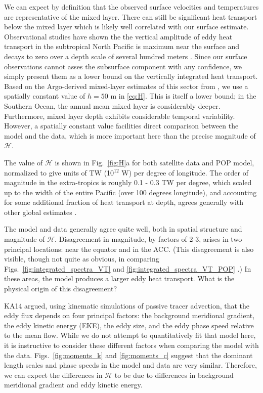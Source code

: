 \documentclass[10pt]{article}
\begin{document}
We can expect by definition that the observed surface velocities and temperatures are representative of the mixed layer. There can still be significant heat transport below the mixed layer which is likely well correlated with our surface estimate. Observational studies have shown the the vertical amplitude of eddy heat transport in the subtropical North Pacific is maximum near the surface and decays to zero over a depth scale of several hundred meters \citep{RoemmichGilson2001,QiuChen2005}. Since our surface observations cannot asses the subsurface component with any confidence, we simply present them as a lower bound on the vertically integrated heat transport. Based on the Argo-derived mixed-layer estimates of this sector from \citet{HolteTalley2009}, we use a spatially constant value of $h = 50$ m in \eqref{eq:H}. This is itself a lower bound; in the Southern Ocean, the annual mean mixed layer is considerably deeper. Furthermore, mixed layer depth exhibits considerable temporal variability. However, a spatially constant value facilities direct comparison between the model and the data, which is more important here than the precise magnitude of $\mathcal{H}$.

The value of $\mathcal{H}$ is shown in Fig.~\ref{fig:H}a for both satellite data and POP model, normalized to give units of TW (10$^{12}$ W) per degree of longitude. The order of magnitude in the extra-tropics is roughly 0.1 - 0.3 TW per degree, which scaled up to the width of the entire Pacific (over 100 degrees longitude), and accounting for some additional fraction of heat transport at depth, agrees generally with other global estimates \citep{JayneMarotzke2002,VolkovEtAl2008,DongEtAl2014}. 

The model and data generally agree quite well, both in spatial structure and magnitude of $\mathcal{H}$. Disagreement in magnitude, by factors of 2-3, arises in two principal locations: near the equator and in the ACC. (This disagreement is also visible, though not quite as obvious, in comparing Figs.~\ref{fig:integrated_spectra_VT} and \ref{fig:integrated_spectra_VT_POP} .) In these areas, the model produces a larger eddy heat transport. What is the physical origin of this disagreement?

KA14 argued, using kinematic simulations of passive tracer advection, that the eddy flux depends on four principal factors: the background meridional gradient, the eddy kinetic energy (EKE), the eddy size, and the eddy phase speed relative to the mean flow. While we do not attempt to quantitatively fit that model here, it is instructive to consider these different factors when comparing the model with the data. Figs.~\ref{fig:moments_k} and \ref{fig:moments_c} suggest that the dominant length scales and phase speeds in the model and data are very similar. Therefore, we can expect the differences in $\mathcal{H}$ to be due to differences in background meridional gradient and eddy kinetic energy. 
\end{document}
